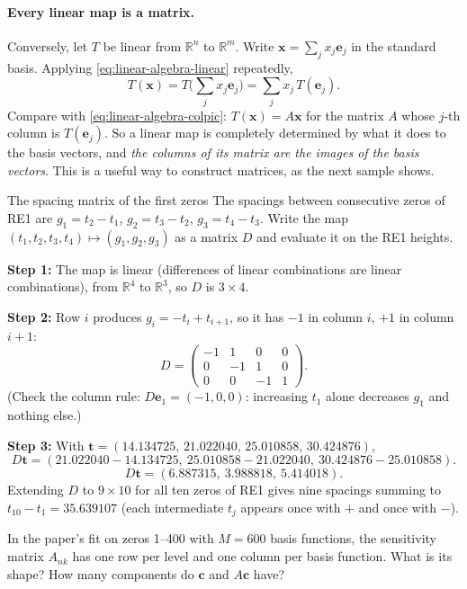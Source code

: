 \paragraph{Every linear map is a matrix.} Conversely, let $T$ be linear from $\mathbb R^n$ to $\mathbb R^m$. Write $\bm x=\sum_jx_j\bm e_j$ in the standard basis. Applying \cref{eq:linear-algebra-linear} repeatedly,
\[
T(\bm x)=T\Big(\sum_jx_j\bm e_j\Big)=\sum_jx_j\,T(\bm e_j).
\]
Compare with \cref{eq:linear-algebra-colpic}: $T(\bm x)=A\bm x$ for the matrix $A$ whose $j$-th column is $T(\bm e_j)$. So a linear map is completely determined by what it does to the basis vectors, and \emph{the columns of its matrix are the images of the basis vectors}. This is a useful way to construct matrices, as the next sample shows.

\begin{sample}{The spacing matrix of the first zeros}
The spacings between consecutive zeros of RE1 are $g_1=t_2-t_1$, $g_2=t_3-t_2$, $g_3=t_4-t_3$. Write the map $(t_1,t_2,t_3,t_4)\mapsto(g_1,g_2,g_3)$ as a matrix $D$ and evaluate it on the RE1 heights.

\textbf{Step 1:} The map is linear (differences of linear combinations are linear combinations), from $\mathbb R^4$ to $\mathbb R^3$, so $D$ is $3\times4$.

\textbf{Step 2:} Row $i$ produces $g_i=-t_i+t_{i+1}$, so it has $-1$ in column $i$, $+1$ in column $i+1$:
\[
D=\begin{pmatrix}-1&1&0&0\\0&-1&1&0\\0&0&-1&1\end{pmatrix}.
\]
(Check the column rule: $D\bm e_1=(-1,0,0)$: increasing $t_1$ alone decreases $g_1$ and nothing else.)

\textbf{Step 3:} With $\bm t=(14.134725,\,21.022040,\,25.010858,\,30.424876)$,
\[
D\bm t=(21.022040-14.134725,\ 25.010858-21.022040,\ 30.424876-25.010858).
\]
\[
\boxed{D\bm t=(6.887315,\ 3.988818,\ 5.414018).}
\]
Extending $D$ to $9\times10$ for all ten zeros of RE1 gives nine spacings summing to $t_{10}-t_1=35.639107$ (each intermediate $t_j$ appears once with $+$ and once with $-$).
\end{sample}

\begin{checkpoint}
In the paper's fit on zeros 1--400 with $M=600$ basis functions, the sensitivity matrix $A_{nk}$ has one row per level and one column per basis function. What is its shape? How many components do $\bm c$ and $A\bm c$ have?
\end{checkpoint}

